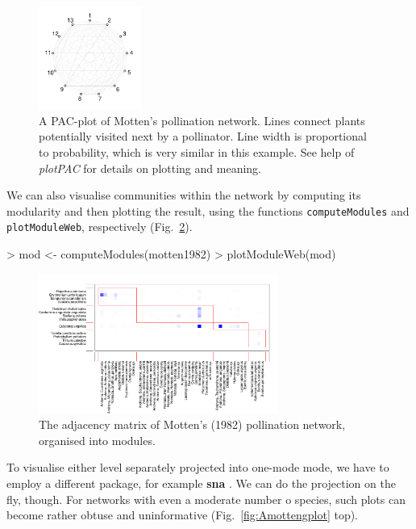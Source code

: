 \documentclass[a4paper, 11pt]{article}
\newcommand{\package}[1]{\textbf{#1}}
\begin{document}
\begin{figure}
  \vspace{-2cm}
	\includegraphics[width=0.3\textwidth]{figures/motten1982_PACplot}
	\caption{A PAC-plot of Motten's \citeyear{Motten1982} pollination network. Lines connect plants potentially visited next by a pollinator. Line width is proportional to probability, which is very similar in this example. See help of \emph{plotPAC} for details on plotting and meaning.}
	\label{fig:AplotPAC}
\end{figure}
%
We can also visualise communities within the network by computing its modularity and then plotting the result, using the functions \texttt{computeModules} and \texttt{plotModuleWeb}, respectively (Fig.~\ref{fig:Amoduleplot}).
\begin{Schunk}
\begin{Sinput}
> mod <- computeModules(motten1982)
> plotModuleWeb(mod)
\end{Sinput}
\end{Schunk}
\begin{figure}%
\centering
	\includegraphics[width=0.7\textwidth]{figures/motten1982_moduleplot}
	\caption{The adjacency matrix of Motten's (1982) pollination network, organised into modules.}
	\label{fig:Amoduleplot}
\end{figure}
%
To visualise either level separately projected into one-mode mode, we have to employ a different package, for example \package{sna} \citep{Butts2013}. We can do the projection on the fly, though. For networks with even a moderate number o species, such plots can become rather obtuse and uninformative (Fig.~\ref{fig:Amottengplot} top).
\end{document}
